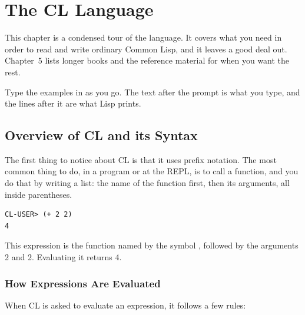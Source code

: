 \chapter{The CL Language}

This chapter is a condensed tour of the language. It covers what you
need in order to read and write ordinary Common Lisp, and it leaves a
good deal out. Chapter~5 lists longer books and the reference
material for when you want the rest.

Type the examples in as you go. The text after the 
prompt is what you type, and the lines after it are what Lisp prints.

\section{Overview of CL and its Syntax}

The first thing to notice about CL is that it uses prefix
notation. The most common thing to do, in a program or at the
REPL, is to call a function, and you do that by writing a list: the
name of the function first, then its arguments, all inside
parentheses.

\begin{verbatim}
CL-USER> (+ 2 2)
4
\end{verbatim}

This expression is the function named by the symbol \code{+},
followed by the arguments 2 and 2. Evaluating it returns 4.

\subsection{How Expressions Are Evaluated}

When CL is asked to evaluate an expression, it follows a few rules:

